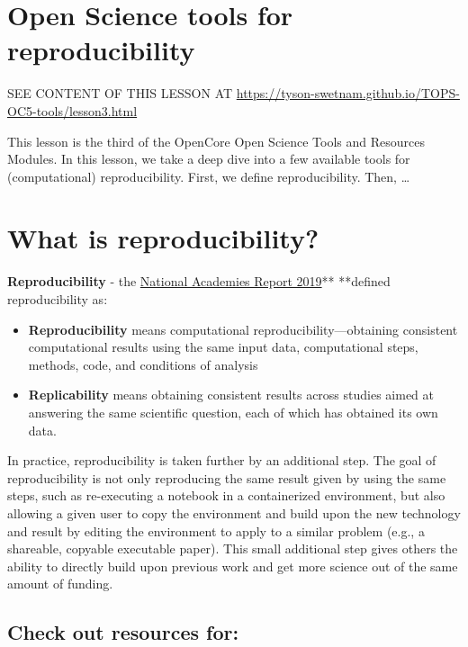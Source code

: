 \documentclass[
  letterpaper,
  DIV=11,
  numbers=noendperiod]{scrreport}
\providecommand{\tightlist}{%
  \setlength{\itemsep}{0pt}\setlength{\parskip}{0pt}}\usepackage{longtable,booktabs,array}
\begin{document}
\hypertarget{open-science-tools-for-reproducibility-1}{%
\section{Open Science tools for
reproducibility}\label{open-science-tools-for-reproducibility-1}}

SEE CONTENT OF THIS LESSON AT
\url{https://tyson-swetnam.github.io/TOPS-OC5-tools/lesson3.html}

This lesson is the third of the OpenCore Open Science Tools and
Resources Modules. In this lesson, we take a deep dive into a few
available tools for (computational) reproducibility. First, we define
reproducibility. Then, \ldots{}

\hypertarget{what-is-reproducibility}{%
\section{What is reproducibility?}\label{what-is-reproducibility}}

\textbf{Reproducibility } - the
\href{https://www.nationalacademies.org/our-work/reproducibility-and-replicability-in-science}{National
Academies Report 2019}** **defined reproducibility as:

\begin{itemize}
\tightlist
\item
  \textbf{Reproducibility} means computational
  reproducibility---obtaining consistent computational results using the
  same input data, computational steps, methods, code, and conditions of
  analysis
\item
  \textbf{Replicability} means obtaining consistent results across
  studies aimed at answering the same scientific question, each of which
  has obtained its own data.
\end{itemize}

In practice, reproducibility is taken further by an additional step. The
goal of reproducibility is not only reproducing the same result given by
using the same steps, such as re-executing a notebook in a containerized
environment, but also allowing a given user to copy the environment and
build upon the new technology and result by editing the environment to
apply to a similar problem (e.g., a shareable, copyable executable
paper). This small additional step gives others the ability to directly
build upon previous work and get more science out of the same amount of
funding.

\hypertarget{check-out-resources-for}{%
\subsection{Check out resources for:}\label{check-out-resources-for}}
\end{document}
